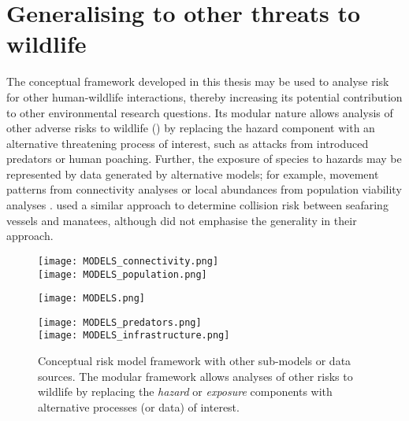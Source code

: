 \section{Generalising to other threats to wildlife}\label{other_threats}

The conceptual framework developed in this thesis may be used to analyse risk for other human-wildlife interactions, thereby increasing its potential contribution to other environmental research questions. Its modular nature allows analysis of other adverse risks to wildlife () by replacing the hazard component with an alternative threatening process of interest, such as attacks from introduced predators or human poaching. Further, the exposure of species to hazards may be represented by data generated by alternative models; for example, movement patterns from connectivity analyses \citep[e.g.][]{mcra08} or local abundances from population viability analyses \citep[e.g.][]{beis02}. \cite{baud13} used a similar approach to determine collision risk between seafaring vessels and manatees, although did not emphasise the generality in their approach.

\begin{figure*}[!h]
  \vspace{0.75cm}
  \centering
  	\begin{minipage}[t][][b]{.15\textwidth}
    	\centering
    	\texttt{[image: MODELS\_connectivity.png]}\\
    	\texttt{[image: MODELS\_population.png]}   	
    \end{minipage}
    \hspace{.05\textwidth}
  	\begin{minipage}{.45\textwidth}
    	\centering
    	\texttt{[image: MODELS.png]}
    \end{minipage}
    \hspace{.05\textwidth}
  	\begin{minipage}[t][][b]{.15\textwidth}
    	\centering
    	\texttt{[image: MODELS\_predators.png]}\\
    	\texttt{[image: MODELS\_infrastructure.png]}
    \end{minipage}    	   	   
  \caption[Conceptual risk model framework for other threats]{Conceptual risk model framework with other sub-models or data sources. The modular framework allows analyses of other risks to wildlife by replacing the \textit{hazard} or \textit{exposure} components with alternative processes (or data) of interest.}
  \label{gen_framework}
  \vspace{0.75cm}
\end{figure*}

